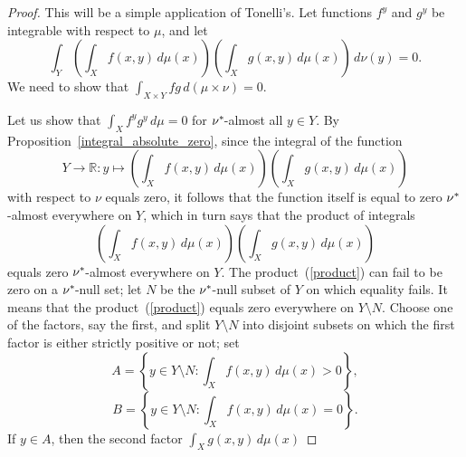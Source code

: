 \documentclass[
twoside=true,
paper=letter,
fontsize=11pt,
pagesize=auto,
leqno,
openany,
headsepline,
overfullrule,
]{scrbook}
\theoremstyle{plain}
\theoremstyle{plain}
\theoremstyle{definition}
\theoremstyle{bfnoteitalic}
\theoremstyle{bfnoteroman}
\newcommand{\R}{\mathbb{R}}
\newcommand{\kernast}{\ast\kern-1pt}
\newcommand{\function}{f}
\newcommand{\functionii}{g}
\newcommand{\measurespace}{X}
\newcommand{\measurespaceii}{Y}
\newcommand{\mspaceelt}{x}
\newcommand{\mspaceeltii}{y}
\newcommand{\measure}{\mu}
\newcommand{\measureii}{\nu}
\newcommand{\seti}{A}
\newcommand{\setii}{B}
\begin{document}
\begin{proof}
This will be a simple application of Tonelli's. 
Let 
functions
$\function^\mspaceeltii$ and $\functionii^\mspaceeltii$
be integrable with respect to $\measure$, and let
\[
\int_\measurespaceii
\left( \int_\measurespace\function(\mspaceelt,\mspaceeltii)\,d\measure(\mspaceelt) \right)
\left( \int_\measurespace\functionii(\mspaceelt,\mspaceeltii)\,d\measure(\mspaceelt) \right)
\,d\measureii(\mspaceeltii)
= 0.
\]
We need to show that 
$\int_{\measurespace\times\measurespaceii}\function\functionii
\, d(\measure\times\measureii)
= 0$.

Let us show that
$\int_\measurespace\function^\mspaceeltii \functionii^\mspaceeltii
\,d\measure = 0$ for $\measureii^\kernast$\hyp{}almost all $\mspaceeltii\in\measurespaceii$.
By Proposition~\ref{integral_absolute_zero}, since the integral of the function
\[
\measurespaceii \to \R:
\mspaceeltii \mapsto
\left( \int_\measurespace\function(\mspaceelt,\mspaceeltii)\,d\measure(\mspaceelt) \right)
\left( \int_\measurespace\functionii(\mspaceelt,\mspaceeltii)\,d\measure(\mspaceelt) \right)
\]
with respect to $\measureii$ equals zero, it follows that the function itself is equal to zero 
$\measureii^\kernast$\hyp{}almost everywhere on $\measurespaceii$, which in turn says that the product of integrals
\begin{equation}\label{product}
\left( \int_\measurespace\function(\mspaceelt,\mspaceeltii)\,d\measure(\mspaceelt) \right)
\left( \int_\measurespace\functionii(\mspaceelt,\mspaceeltii)\,d\measure(\mspaceelt) \right)
\end{equation}
equals zero $\measureii^\kernast$\hyp{}almost everywhere on $\measurespaceii$.
The product~{(\ref{product})} can fail to be zero on a 
$\measureii^\kernast$\hyp{}null set;
let $N$ be the 
$\measureii^\kernast$\hyp{}null subset of $\measurespaceii$ on which equality fails.
It means that the product~{(\ref{product})} equals zero everywhere on $\measurespaceii\setminus N$.
Choose one of the factors, say the first, and split
$\measurespaceii\setminus N$ 
into disjoint subsets on which the first factor is either strictly positive or not; set 
\[
\seti = 
\left\{ 
\mspaceeltii \in \measurespaceii\setminus N : 
\int_\measurespace \function(\mspaceelt,\mspaceeltii) 
\,d \measure(\mspaceelt) > 0 
\right\},
\]
\[
\setii = 
\left\{ 
\mspaceeltii \in \measurespaceii\setminus N : 
\int_\measurespace \function(\mspaceelt,\mspaceeltii) 
\,d \measure(\mspaceelt) = 0 
\right\}.
\]
If $\mspaceeltii\in\seti$, then the second factor  
$\int_\measurespace\functionii(\mspaceelt,\mspaceeltii)\,d\measure(\mspaceelt)$

\end{proof}
\end{document}
